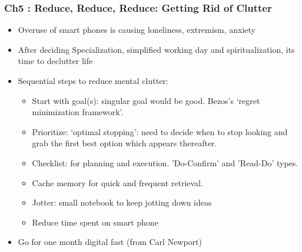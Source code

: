 \begin{frame}[fragile]\frametitle{Ch5 : Reduce, Reduce, Reduce: Getting Rid of Clutter}

\begin{itemize}
\item Overuse of smart phones is causing loneliness, extremism, anxiety
\item After deciding Specialization, simplified working day and spiritualization, its time to declutter life
\item Sequential steps to reduce mental clutter:
	\begin{itemize}
	\item Start with goal(s): singular goal would be good. Bezos's `regret minimization framework'.
	\item Prioritize:  `optimal stopping': need to decide when to stop looking and grab the first best option which appears thereafter.
	\item Checklist: for planning and execution. 'Do-Confirm' and 'Read-Do' types.
	\item Cache memory for quick and frequent retrieval.
	\item Jotter: small notebook to keep jotting down ideas
	\item Reduce time spent on smart phone
	\end{itemize}
\item Go for one month digital fast (from Carl Newport)

\end{itemize}

\end{frame}
